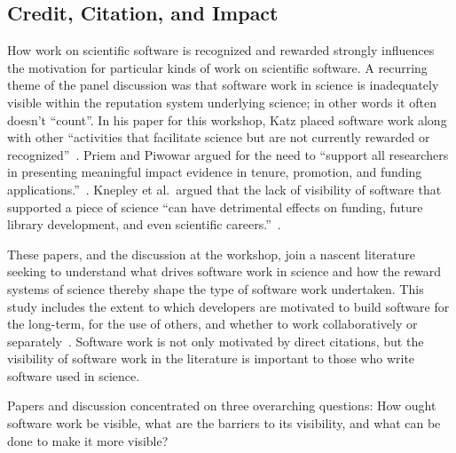 \documentclass[11pt, oneside]{amsart}
\begin{document}
\subsection{Credit, Citation, and Impact}

How work on scientific software is recognized and rewarded strongly
influences the motivation for particular kinds of work on scientific
software. A recurring theme of the panel discussion was that software
work in science is inadequately visible within the reputation system
underlying science; in other words it often doesn't ``count''. In his
paper for this workshop, Katz placed software work along with other
``activities that facilitate science but are not currently rewarded or
recognized''~\cite{Katz2_WSSSPE}. Priem and Piwowar argued for the need
to ``support all researchers in presenting meaningful impact evidence
in tenure, promotion, and funding applications.''~\cite{Priem_WSSSPE}.
Knepley et al.~argued that the lack of visibility of software that
supported a piece of science ``can have detrimental effects on
funding, future library development, and even scientific
careers.''~\cite{Knepley_WSSSPE}.

These papers, and the discussion at the workshop, join a nascent
literature seeking to understand what drives software work in science
and how the reward systems of science thereby shape the type of
software work undertaken. This study includes the extent to which developers are
motivated to build software for the long-term, for the use of others,
and whether to work collaboratively or
separately~\cite{howison_incentives_2013, howison_scientific_2011,
  bietz_synergizing_2010}. Software work is not only motivated by
direct citations, but the visibility of software work in the
literature is important to those who write software used in science.

Papers and discussion concentrated on three overarching questions: How
ought software work be visible, what are the barriers to its
visibility, and what can be done to make it more visible?
\end{document}
